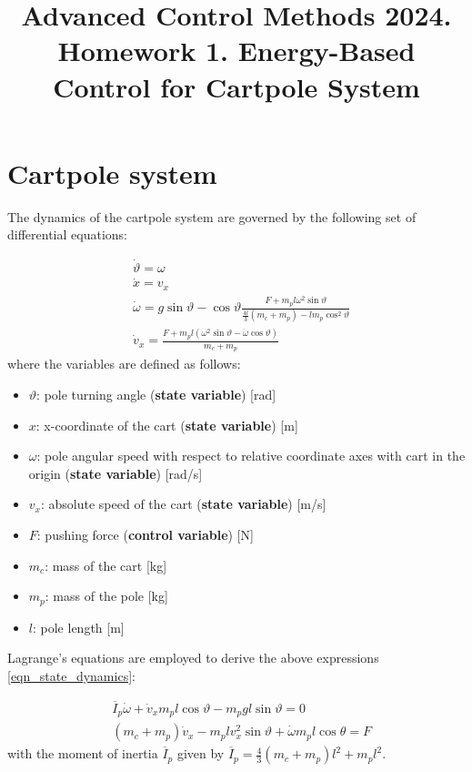 \documentclass[12pt]{article}
\title{Advanced Control Methods 2024. Homework 1. Energy-Based Control for Cartpole System}
\begin{document}
\section*{Cartpole system}

The dynamics of the cartpole system are governed by the following set of differential equations:

\begin{equation}
    \label{eqn_state_dynamics}
    \begin{aligned}
        &\dot{\vartheta} =  \omega \\
        &\dot{x} = v_x \\
        &\dot{\omega} =  g \sin{\vartheta} - \cos{\vartheta}\frac{F + m_p l \omega^2 \sin{\vartheta}}{\frac{4l}{3}(m_c + m_p) - lm_p \cos^2{\vartheta}}\\
        &\dot{v}_x = \frac{F + m_p l (\omega ^2 \sin{\vartheta} - \dot{\omega}   \cos{\vartheta})}{m_c + m_p}
    \end{aligned}
\end{equation}
where the variables are defined as follows:
\begin{itemize}
\item $\vartheta$: pole turning angle (\textbf{state variable}) [rad]
\item $x$: x-coordinate of the cart (\textbf{state variable}) [m]
\item $\omega$: pole angular speed with respect to relative coordinate axes with cart in the origin (\textbf{state variable}) [rad/s]
\item $v_x$: absolute speed of the cart (\textbf{state variable}) [m/s]
\item $F$: pushing force (\textbf{control variable}) [N]
\item $m_c$: mass of the cart [kg]
\item $m_p$: mass of the pole [kg]
\item $l$: pole length [m]
  
\end{itemize}
Lagrange's equations are employed to derive the above expressions \eqref{eqn_state_dynamics}:

\begin{eqnarray}
\label{eqn_sum_moments}
& \overline{I}_p \dot{\omega} + \dot{v}_x m_p l\cos \vartheta  - m_p g l \sin \vartheta = 0 \\ 
\label{eqn_2nd_newton_law}
& (m_c + m_p) \dot{v}_x - m_p l v_x^2 \sin \vartheta + \dot{\omega} m_p l \cos \theta  = F
\end{eqnarray}
with the moment of inertia $\overline{I}_p$ given by $\overline{I}_p  = \frac{4}{3}(m_c + m_p) l ^ 2 + m_p l ^ 2$.
\end{document}
